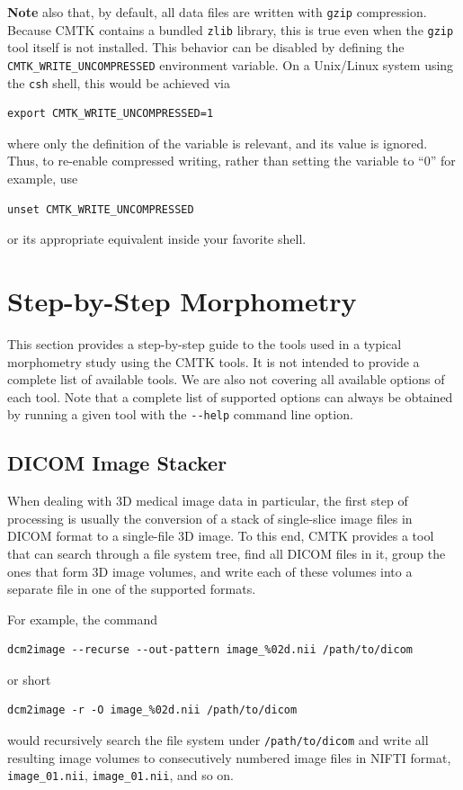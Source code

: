 \documentclass{InsightArticle}
\begin{document}
{\bf Note} also that, by default, all data files are written with \verb|gzip|
compression. Because CMTK contains a bundled \verb|zlib| library, this is true
even when the \verb|gzip| tool itself is not installed. This behavior can be
disabled by defining the \verb|CMTK_WRITE_UNCOMPRESSED| environment
variable. On a Unix/Linux system using the \verb|csh| shell, this would be
achieved via
\begin{verbatim}
export CMTK_WRITE_UNCOMPRESSED=1
\end{verbatim}
where only the definition of the variable is relevant, and its value is
ignored. Thus, to re-enable compressed writing, rather than setting the
variable to ``0'' for example, use
\begin{verbatim}
unset CMTK_WRITE_UNCOMPRESSED
\end{verbatim}
or its appropriate equivalent inside your favorite shell.

\section{Step-by-Step Morphometry}

This section provides a step-by-step guide to the tools used in a typical
morphometry study using the CMTK tools. It is not intended to provide a
complete list of available tools. We are also not covering all available
options of each tool. Note that a complete list of supported options can
always be obtained by running a given tool with the \verb|--help| command line
option.

\subsection{DICOM Image Stacker}

When dealing with 3D medical image data in particular, the first step of
processing is usually the conversion of a stack of single-slice image files in
DICOM format to a single-file 3D image. To this end, CMTK provides a tool that
can search through a file system tree, find all DICOM files in it, group the
ones that form 3D image volumes, and write each of these volumes into a
separate file in one of the supported formats.

For example, the command
\begin{verbatim}
dcm2image --recurse --out-pattern image_%02d.nii /path/to/dicom
\end{verbatim}
or short
\begin{verbatim}
dcm2image -r -O image_%02d.nii /path/to/dicom
\end{verbatim}
would recursively search the file system under {\tt /path/to/dicom} and write
all resulting image volumes to consecutively numbered image files in NIFTI
format, {\tt image\_01.nii},  {\tt image\_01.nii}, and so on.
\end{document}
